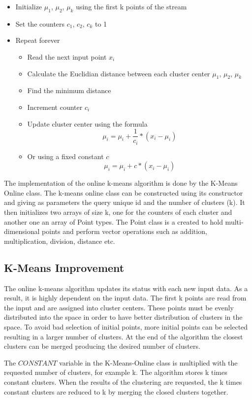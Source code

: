 \documentclass{lmproj}
\begin{document}
\begin{itemize}
	\item Initialize $\mu_{1}$, $\mu_{2}$, $\mu_{k}$  using the first k points of the stream
	\item Set the counters $c_{1}$, $c_{2}$, $c_{k}$  to 1
	\item Repeat forever
	\begin{itemize}
	\item Read the next input point $x_{i}$
	\item Calculate the Euclidian distance between each cluster center $\mu_{1}$, $\mu_{2}$, $\mu_{k}$
	\item Find the minimum distance
	\item Increment counter $c_{i}$
	\item Update cluster center using the formula
	\[ \mu_{i} = \mu_{i} + \frac{1}{c_{i}} * (x_{i} - \mu_{i} )\]
	\item Or using a fixed constant $c$
	\[ \mu_{i} = \mu_{i} + c * (x_{i} - \mu_{i} )\]
	\end{itemize}
\end{itemize}

The implementation of the online k-means algorithm is done by the K-Means Online class. The k-means online class can be constructed using its constructor and giving as parameters the query unique id and the number of clusters (k). It then initializes two arrays of size k, one for the counters of each cluster and another one an array of Point types. The Point class is a created to hold multi-dimensional points and perform vector operations such as addition, multiplication, division, distance etc. 

\subsection{K-Means Improvement}

The online k-means algorithm updates its status with each new input data. As a result, it is highly dependent on the input data. The first k points are read from the input and are assigned into cluster centers. These points must be evenly distributed into the space in order to have better distribution of clusters in the space. To avoid bad selection of initial points, more initial points can be selected resulting in a larger number of clusters. At the end of the algorithm the closest clusters can be merged producing the desired number of clusters.

The $CONSTANT$ variable in the K-Means-Online class is multiplied with the requested number of clusters, for example k. The algorithm stores k times constant clusters. When the results of the clustering are requested, the k times constant clusters are reduced to k by merging the closed clusters together.
\end{document}
